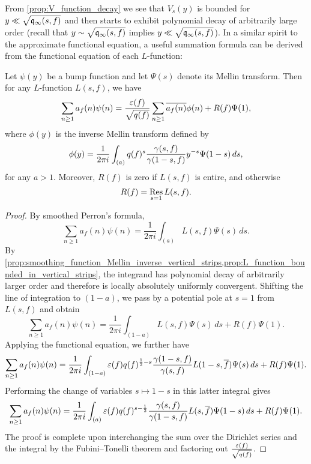     From \cref{prop:V_function_decay} we see that $V_{s}(y)$ is bounded for $y \ll \sqrt{\mathfrak{q}_{\infty}(s,f)}$ and then starts to exhibit polynomial decay of arbitrarily large order (recall that $y \sim \sqrt{\mathfrak{q}_{\infty}(s,f)}$ implies $y \ll \sqrt{\mathfrak{q}_{\infty}(s,f)}$). In a similar spirit to the approximate functional equation, a useful summation formula can be derived from the functional equation of each $L$-function:

    \begin{theorem}
      Let $\psi(y)$ be a bump function and let $\Psi(s)$ denote its Mellin transform. Then for any $L$-function $L(s,f)$, we have
      \[
        \sum_{n \ge 1}a_{f}(n)\psi(n) = \frac{\varepsilon(f)}{\sqrt{q(f)}}\sum_{n \ge 1}\overline{a_{f}(n)}\phi(n)+R(f)\Psi(1),
      \]
      where $\phi(y)$ is the inverse Mellin transform defined by
      \[
        \phi(y) = \frac{1}{2\pi i}\int_{(a)}q(f)^{s}\frac{\gamma(s,f)}{\gamma(1-s,f)}y^{-s}\Psi(1-s)\,ds,
      \]
      for any $a > 1$. Moreover, $R(f)$ is zero if $L(s,f)$ is entire, and otherwise
      \[
        R(f) = \operatorname*{\mathrm{Res}}_{s = 1}L(s,f).
      \]
    \end{theorem}
    \begin{proof}
      By smoothed Perron's formula,
      \[
        \sum_{n \ge 1}a_{f}(n)\psi(n) = \frac{1}{2\pi i}\int_{(a)}L(s,f)\Psi(s)\,ds.
      \]
      By \cref{prop:smoothing_function_Mellin_inverse_vertical_strips,prop:L_function_bounded_in_vertical_strips}, the integrand has polynomial decay of arbitrarily larger order and therefore is locally absolutely uniformly convergent. Shifting the line of integration to $(1-a)$, we pass by a potential pole at $s = 1$ from $L(s,f)$ and obtain
      \[
        \sum_{n \ge 1}a_{f}(n)\psi(n) = \frac{1}{2\pi i}\int_{(1-a)}L(s,f)\Psi(s)\,ds+R(f)\Psi(1).
      \]
      Applying the functional equation, we further have
      \[
        \sum_{n \ge 1}a_{f}(n)\psi(n) = \frac{1}{2\pi i}\int_{(1-a)}\varepsilon(f)q(f)^{\frac{1}{2}-s}\frac{\gamma(1-s,f)}{\gamma(s,f)}L(1-s,\overline{f})\Psi(s)\,ds+R(f)\Psi(1).
      \]
      Performing the change of variables $s \mapsto 1-s$ in this latter integral gives
      \[
        \sum_{n \ge 1}a_{f}(n)\psi(n) = \frac{1}{2\pi i}\int_{(a)}\varepsilon(f)q(f)^{s-\frac{1}{2}}\frac{\gamma(s,f)}{\gamma(1-s,f)}L(s,\overline{f})\Psi(1-s)\,ds+R(f)\Psi(1).
      \]
      The proof is complete upon interchanging the sum over the Dirichlet series and the integral by the Fubini–Tonelli theorem and factoring out $\frac{\varepsilon(f)}{\sqrt{q(f)}}$.
    \end{proof}
